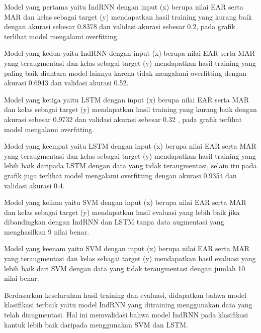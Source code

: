 Model yang pertama yaitu IndRNN dengan input (x) berupa nilai EAR serta MAR dan kelas
sebagai target (y) mendapatkan hasil training yang kurang baik dengan akurasi sebesar 0.8378 dan validasi akurasi sebesar 0.2,
pada grafik terlihat model mengalami overfitting.

Model yang kedua yaitu IndRNN dengan input (x) berupa nilai EAR serta MAR yang teraugmentasi dan kelas
sebagai target (y) mendapatkan hasil training yang paling baik diantara model lainnya karena tidak mengalami
overfitting dengan akurasi 0.6943 dan validasi akurasi 0.52.

Model yang ketiga yaitu LSTM dengan input (x) berupa nilai EAR serta MAR dan kelas
sebagai target (y) mendapatkan hasil training yang kurang baik dengan akurasi sebesar 0.9732 dan validasi akurasi sebesar 0.32
, pada grafik terlihat model mengalami overfitting.

Model yang keempat yaitu LSTM dengan input (x) berupa nilai EAR serta MAR yang teraugmentasi dan kelas
sebagai target (y) mendapatkan hasil training yang lebih baik daripada LSTM dengan data yang tidak teraugmentasi,
selain itu pada grafik juga terlihat model mengalami overfitting dengan akurasi 0.9354 dan validasi akurasi 0.4.

Model yang kelima yaitu SVM dengan input (x) berupa nilai EAR serta MAR dan kelas
sebagai target (y) mendapatkan hasil evaluasi yang lebih baik jika dibandingkan dengan IndRNN dan LSTM tanpa data
augmentasi yang menghasilkan 9 nilai benar.

Model yang keenam yaitu SVM dengan input (x) berupa nilai EAR serta MAR yang teraugmentasi dan kelas sebagai target 
(y) mendapatkan hasil evaluasi yang lebih baik dari SVM dengan data yang tidak teraugmentasi dengan jumlah 10 nilai benar. 

Berdasarkan keseluruhan hasil training dan evaluasi, didapatkan bahwa model klasifikasi terbaik yaitu model IndRNN yang
ditraining menggunakan data yang telah diaugmentasi. Hal ini memvalidasi bahwa model IndRNN pada klasifikasi kantuk
lebih baik daripada menggunakan SVM dan LSTM.

